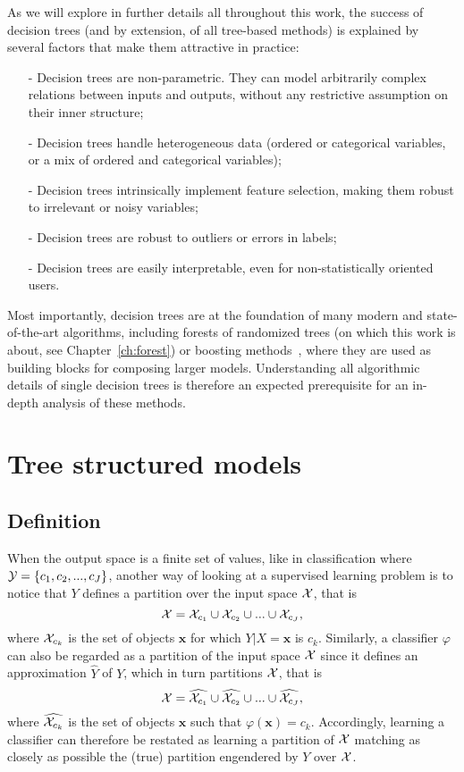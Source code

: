 As we will explore in further details all throughout this work, the success
of decision trees (and by extension, of all tree-based methods) is explained
by several factors that make them attractive in practice:
\begin{itemize}
\item[-] Decision trees are non-parametric. They can model arbitrarily complex relations between inputs and outputs, without any restrictive assumption on their inner structure;
\item[-] Decision trees handle heterogeneous data (ordered or categorical variables, or a mix of ordered and categorical variables);
\item[-] Decision trees intrinsically implement feature selection, making them robust to irrelevant or noisy variables;
\item[-] Decision trees are robust to outliers or errors in labels;
\item[-] Decision trees are easily interpretable, even for non-statistically oriented users.
\end{itemize}

Most importantly, decision trees are at the foundation of
many modern and state-of-the-art algorithms, including forests of randomized
trees (on which this work is about, see Chapter~\ref{ch:forest}) or
boosting methods~\citep{freund:1995,friedman:2001}, where they are used
as building blocks for composing larger models. Understanding all algorithmic
details of single decision trees is therefore an expected prerequisite
for an in-depth analysis of these methods.


\section{Tree structured models}
\label{sec:3:tree-structured-models}

\subsection{Definition}

When the output space is a finite set of values, like in classification where
${\cal Y} = \{c_1, c_2, ..., c_J\}$, another way of looking at a supervised
learning problem is to notice that $Y$ defines a partition over the input space
${\cal X}$, that is $${\cal X} = {\cal X}_{c_1} \cup {\cal X}_{c_2} \cup ...
\cup {\cal X}_{c_J},$$ where ${\cal X}_{c_k}$ is the set of objects
$\mathbf{x}$ for which $Y|X=\mathbf{x}$ is $c_k$. Similarly, a classifier
$\varphi$ can also be regarded as a partition of the input space ${\cal X}$
since it defines an approximation $\widehat{Y}$ of $Y$, which in turn
partitions ${\cal X}$, that is $${\cal X} = \widehat{{\cal X}_{c_1}} \cup
\widehat{{\cal X}_{c_2}} \cup ... \cup \widehat{{\cal X}_{c_J}},$$ where
$\widehat{{\cal X}_{c_k}}$ is the set of objects $\mathbf{x}$ such that
$\varphi(\mathbf{x}) = c_k$. Accordingly, learning a classifier can
therefore be restated as learning a partition of ${\cal X}$ matching as closely
as possible the (true) partition engendered by $Y$ over ${\cal X}$.

